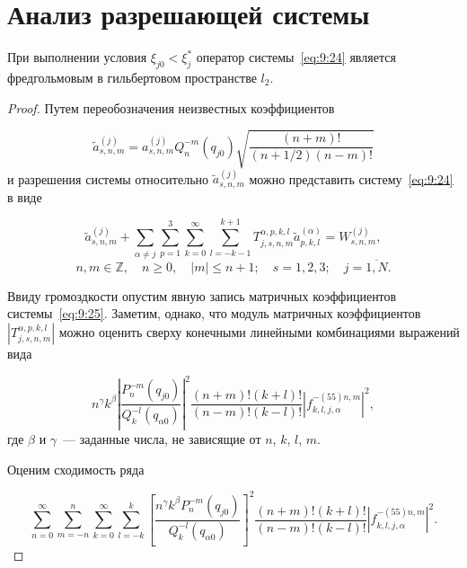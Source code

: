 \section{Анализ разрешающей системы}

\begin{theorem}
При выполнении условия ${\xi _{j0}} < \xi _j^*$ оператор системы~\eqref{eq:9:24} является фредгольмовым в гильбертовом пространстве $l_2$.
\end{theorem}

\begin{proof}
Путем переобозначения неизвестных коэффициентов

\begin{equation}
\tilde a_{s,n,m}^{(j)} = a_{s,n,m}^{(j)}Q_n^{ - m}({q_{j0}})\sqrt {\frac{{(n + m)!}}{{(n + 1/2)(n - m)!}}}
\end{equation}
и разрешения системы относительно $\tilde a_{s,n,m}^{(j)}$ можно представить систему~\eqref{eq:9:24} в виде

\begin{equation}
\tilde a_{s,n,m}^{(j)} + \sum\limits_{\alpha\neq j}\sum\limits_{p = 1}^3 {\sum\limits_{k = 0}^\infty  {\sum\limits_{l =  - k - 1}^{k + 1} {T_{j,s,n,m}^{\alpha,p,k,l}} } } \tilde a_{p,k,l}^{(\alpha)} = W_{s,n,m}^{(j)},
\label{eq:9:25}
\end{equation}
$$n,m \in\mathbb{Z},\quad n \ge 0,\quad |m| \le n + 1;\quad s = 1,2,3;\quad j = \overline{1,N}.$$

Ввиду громоздкости опустим явную запись матричных коэффициентов системы~\eqref{eq:9:25}. Заметим, однако, что модуль матричных коэффициентов $\left|T_{j,s,n,m}^{\alpha,p,k,l}\right|$ можно оценить сверху конечными линейными комбинациями выражений вида

\begin{equation}
{n^\gamma }{k^\beta }{\left| {\frac{{P_n^{ - m}\left( {{q_{j0}}} \right)}}{{Q_k^{ - l}\left( {{q _{\alpha 0}}} \right)}}} \right|^2}\frac{{(n + m)!(k + l)!}}{{(n - m)!(k - l)!}}{\left| {f_{k,l,j,\alpha}^{-(55)n,m}} \right|^2},
\label{eq:9:26}
\end{equation}
где $\beta$ и $\gamma$~--- заданные числа, не зависящие от $n$, $k$, $l$, $m$.

Оценим сходимость ряда

\begin{equation}
\sum\limits_{n = 0}^\infty\sum\limits_{m =  - n}^n\sum\limits_{k = 0}^\infty  \sum\limits_{l =  - k}^k{{\left[ {\frac{{{n^\gamma }{k^\beta }P_n^{ - m}({q_{j0}})}}{{Q_k^{ - l}\left( {{q _{\alpha 0}}} \right)}}} \right]}^2}\frac{{(n + m)!(k + l)!}}{{(n - m)!(k - l)!}}{{\left| {f_{k,l,j,\alpha}^{-(55)n,m}} \right|}^2}.   
\label{eq:9:27}
\end{equation}


\end{proof}
